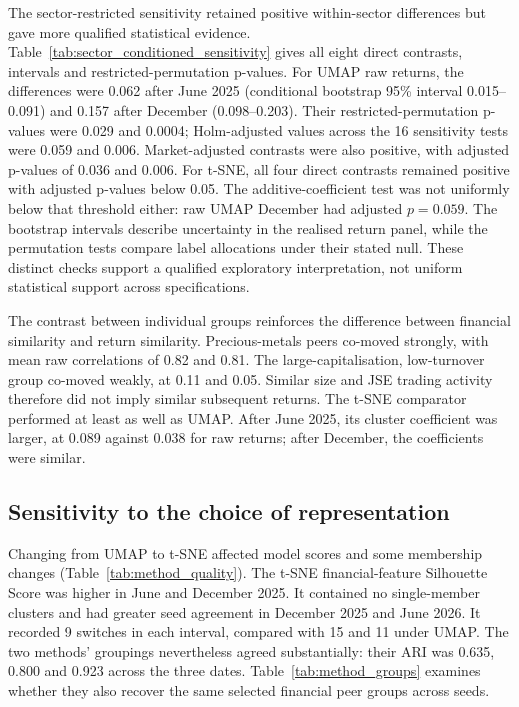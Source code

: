 The sector-restricted sensitivity retained positive within-sector differences but gave more qualified statistical evidence. Table~\ref{tab:sector_conditioned_sensitivity} gives all eight direct contrasts, intervals and restricted-permutation p-values. For UMAP raw returns, the differences were 0.062 after June 2025 (conditional bootstrap 95\% interval 0.015--0.091) and 0.157 after December (0.098--0.203). Their restricted-permutation p-values were 0.029 and 0.0004; Holm-adjusted values across the 16 sensitivity tests were 0.059 and 0.006. Market-adjusted contrasts were also positive, with adjusted p-values of 0.036 and 0.006. For t-SNE, all four direct contrasts remained positive with adjusted p-values below 0.05. The additive-coefficient test was not uniformly below that threshold either: raw UMAP December had adjusted $p=0.059$. The bootstrap intervals describe uncertainty in the realised return panel, while the permutation tests compare label allocations under their stated null. These distinct checks support a qualified exploratory interpretation, not uniform statistical support across specifications.


The contrast between individual groups reinforces the difference between financial similarity and return similarity. Precious-metals peers co-moved strongly, with mean raw correlations of 0.82 and 0.81. The large-capitalisation, low-turnover group co-moved weakly, at 0.11 and 0.05. Similar size and JSE trading activity therefore did not imply similar subsequent returns. The t-SNE comparator performed at least as well as UMAP. After June 2025, its cluster coefficient was larger, at 0.089 against 0.038 for raw returns; after December, the coefficients were similar.

\subsection{Sensitivity to the choice of representation}\label{sec:method_comparison}

Changing from UMAP to t-SNE affected model scores and some membership changes (Table~\ref{tab:method_quality}). The t-SNE financial-feature Silhouette Score was higher in June and December 2025. It contained no single-member clusters and had greater seed agreement in December 2025 and June 2026. It recorded 9 switches in each interval, compared with 15 and 11 under UMAP. The two methods' groupings nevertheless agreed substantially: their ARI was 0.635, 0.800 and 0.923 across the three dates. Table~\ref{tab:method_groups} examines whether they also recover the same selected financial peer groups across seeds.

